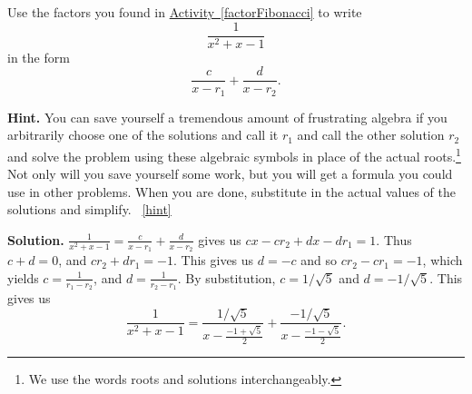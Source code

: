 \documentclass{book}
\begin{document}
\setcounter{project}{268}
\addtocounter{project}{-1}
\begin{activity}[]\label{fractionFibonacci}
\hypertarget{p-1408}{}%
Use the factors you found in \hyperref[factorFibonacci]{Activity~\ref{factorFibonacci}} to write%
\begin{equation*}
\frac{1}{x^2+x-1}
\end{equation*}
in the form%
\begin{equation*}
\frac{c}{x-r_1} + \frac{d}{x-r_2}.
\end{equation*}
%
\par\smallskip%
\noindent\textbf{Hint.}\hypertarget{hint-171}{}\quad%
\hypertarget{p-1409}{}%
You can save yourself a tremendous amount of frustrating algebra if you arbitrarily choose one of the solutions and call it \(r_1\) and call the other solution \(r_2\) and solve the problem using these algebraic symbols in place of the actual roots.\footnote{We use the words roots and solutions interchangeably.\label{fn-18}} Not only will you save yourself some work, but you will get a formula you could use in other problems. When you are done, substitute in the actual values of the solutions and simplify.%
~\hfill{\tiny\hyperlink{a-268}{[hint]}\hypertarget{q-268}{}}\par\smallskip%
\noindent\textbf{Solution.}\hypertarget{solution-190}{}\quad%
\hypertarget{p-1410}{}%
\(\frac{1}{x^2+x-1}=\frac{c}{x-r_1}+\frac{d}{x-r_2}\) gives us \(cx-cr_2+dx-dr_1=1\). Thus \(c+d=0\), and \(cr_2+dr_1 =-1\). This gives us \(d=-c\) and so \(cr_2-cr_1=-1\), which yields \(c=\frac{1}{r_1-r_2}\), and \(d=\frac{1}{r_2-r_1}\). By substitution, \(c=1/\sqrt{5}\) and \(d=-1/\sqrt{5}\). This gives us%
\begin{equation*}
\frac{1}{x^2+x-1} = \frac{1/\sqrt{5}}{x-\frac{-1+\sqrt{5}}{2}}
+ \frac{-1/\sqrt{5}}{x- \frac{-1-\sqrt{5}}{2}}\text{.}
\end{equation*}
%
\end{activity}
\end{document}
